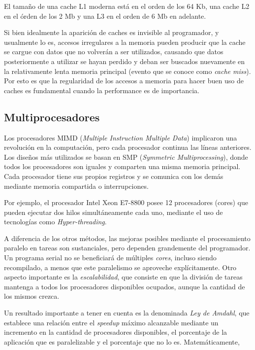El tama\~no de una cache L1 moderna est\'a en el orden de los 64 Kb, una cache L2 en el \'orden de los 2 Mb y
una L3 en el orden de 6 Mb en adelante.

Si bien idealmente la aparici\'on de caches es invisible al programador, y usualmente lo es, accesos irregulares a la
memoria pueden producir que la cache se cargue con datos que no volver\'an a ser utilizados, causando que datos posteriormente
a utilizar se hayan perdido y deban ser buscados nuevamente en la relativamente lenta memoria principal (evento que se conoce como
\textit{cache miss}). Por esto es que la regularidad de los accesos a memoria para hacer buen uso de caches es
fundamental cuando la performance es de importancia.

\subsection{Multiprocesadores}

Los procesadores MIMD (\textit{Multiple Instruction Multiple Data}) implicaron una revoluci\'on en la computaci\'on, pero
cada procesador continua las l\'ineas anteriores.  Los dise\~nos m\'as utilizados se basan en SMP (\textit{Symmetric
Multiprocessing}), donde todos los procesadores son iguales y comparten una misma memoria principal. Cada procesador tiene
sus propios registros y se comunica con los dem\'as mediante memoria compartida o interrupciones.

Por ejemplo, el procesador Intel Xeon E7-8800 posee 12 procesadores (cores) que pueden ejecutar dos hilos simult\'aneamente
cada uno, mediante el uso de tecnolog\'ias como \textit{Hyper-threading}.

A diferencia de los otros m\'etodos, las mejoras posibles mediante el procesamiento paralelo en tareas son sustanciales,
pero dependen grandemente del programador. Un programa serial no se beneficiar\'a de m\'ultiples \textit{cores},
incluso siendo recompilado, a menos que este paralelismo se aproveche expl\'icitamente. Otro aspecto importante es la
\textit{escalabilidad}, que consiste en que la divisi\'on de tareas mantenga a todos los procesadores disponibles ocupados,
aunque la cantidad de los mismos crezca.

Un resultado importante a tener en cuenta es la denominada \textit{Ley de Amdahl}, que establece una relaci\'on entre
el \textit{speedup} m\'aximo alcanzable mediante un incremento en la cantidad de procesadores disponibles, el porcentaje
de la aplicaci\'on que es paralelizable y el porcentaje que no lo es. Matem\'aticamente,


